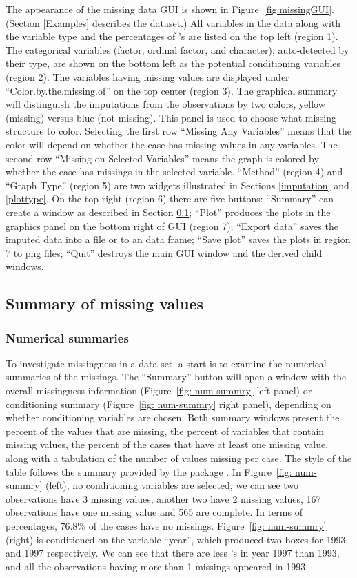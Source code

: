 \documentclass[article]{jss}
\begin{document}
The appearance of the missing data GUI is shown in Figure~\ref{fig:missingGUI}. (Section \ref{Examples} describes the dataset.) All variables in the data along with the variable type and the percentages of 's are listed on the top left (region 1). The categorical variables (factor, ordinal factor, and character), auto-detected by their type, are shown on the bottom left as the potential conditioning variables (region 2). The variables having missing values are displayed under ``Color.by.the.missing.of'' on the top center (region 3). The graphical summary will distinguish the imputations from the observations by two colors, yellow (missing) versus blue (not missing). This panel is used to choose what missing structure to color. Selecting the first row ``Missing Any Variables'' means that the color will depend on whether the case has missing values in any variables. The second row ``Missing on Selected Variables'' means the graph is colored by whether the case has missings in the selected variable. ``Method'' (region 4) and ``Graph Type'' (region 5) are two widgets illustrated in Sections \ref{imputation} and \ref{plottype}. On the top right (region 6) there are five buttons: ``Summary'' can create a window as described in Section \ref{numsum}; ``Plot'' produces the plots in the graphics panel on the bottom right of GUI (region 7); ``Export data'' saves the imputed data into a file or to an  data frame; ``Save plot'' saves the plots in region 7 to png files; ``Quit'' destroys the main GUI window and the derived child windows.

\subsection{Summary of missing values}\label{numsum}

\subsubsection{Numerical summaries}
To investigate missingness in a data set, a start is to examine the numerical summaries of the missings. The ``Summary'' button will open a window with the overall missingness information (Figure~\ref{fig: num-summry} left panel) or conditioning summary (Figure~\ref{fig: num-summry} right panel), depending on whether conditioning variables are chosen. Both summary windows present the percent of the values that are missing, the percent of variables that contain missing values, the percent of the cases that have at least one missing value, along with a tabulation of the number of values missing per case. The style of the table follows the summary provided by the package .  In Figure~\ref{fig: num-summry} (left), no conditioning variables are selected, we can see two observations have 3 missing values, another two have 2 missing values, 167 observations have one missing value and 565 are complete. In terms of percentages, 76.8\% of the cases have no missings. Figure~\ref{fig: num-summry} (right) is conditioned on the variable ``year'', which produced two boxes for 1993 and 1997 respectively. We can see that there are less 's in year 1997 than 1993, and all the observations having more than 1 missings appeared in 1993.
\end{document}
